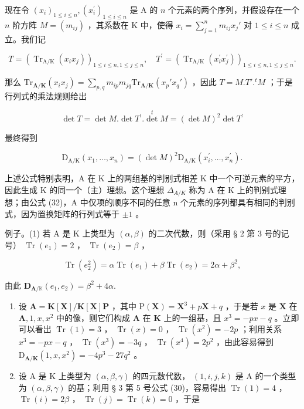 现在令 \((x_{i})_{1\leqslant i\leqslant n},(x_{i}^{\prime})_{1\leqslant i\leqslant n}\) 是 A 的 \(n\) 个元素的两个序列，并假设存在一个 \(n\) 阶方阵 \(M = (m_{ij})\) ，其系数在 K 中，使得 \(x_{i} = \sum_{j=1}^{n} m_{ij} x_{j}'\) 对 \(1 \leqslant i \leqslant n\) 成立。我们记

\[
T = \left(\operatorname{Tr} _ {\mathrm{A} / \mathrm{K}} \left(x _ {i} x _ {j}\right)\right) _ {1 \leqslant i \leqslant n, 1 \leqslant j \leqslant n}, \quad T ^ {\prime} = \left(\operatorname{Tr} _ {\mathrm{A} / \mathrm{K}} \left(x _ {i} ^ {\prime} x _ {j} ^ {\prime}\right)\right) _ {1 \leqslant i \leqslant n, 1 \leqslant j \leqslant n}.
\]

那么 \(\mathrm{Tr}_{\mathbf{A} / \mathbf{K}}(x_i x_j) = \sum_{p,q} m_{ip} m_{jq} \mathrm{Tr}_{\mathbf{A} / \mathbf{K}}(x_p' x_q')\) ，因此 \(T = M. T'.^t M\) ；于是行列式的乘法规则给出

\[
\det T = \det M. \det T ^ {\prime}. \det ^ {t} M = (\det M) ^ {2} \det T ^ {\prime}
\]

最终得到

\[
\mathrm{D} _ {\mathrm{A} / \mathrm{K}} (x _ {1}, \dots , x _ {n}) = (\det M) ^ {2} \mathrm{D} _ {\mathrm{A} / \mathrm{K}} (x _ {i} ^ {\prime}, \dots , x _ {n} ^ {\prime}).\tag{32}
\]

上述公式特别表明，A 在 K 上的两组基的判别式相差 K 中一个可逆元素的平方，因此生成 K 的同一个（主）理想。这个理想 \(\Delta_{A/K}\) 称为 A 在 K 上的判别式理想；由公式 (32)，A 中仅项的顺序不同的任意 n 个元素的序列都具有相同的判别式，因为置换矩阵的行列式等于 \(\pm1\) 。

例子。(1) 若 A 是 K 上类型为 \((\alpha, \beta)\) 的二次代数，则（采用 § 2 第 3 号的记号） \(\operatorname{Tr}(e_1) = 2\) ， \(\operatorname{Tr}(e_2) = \beta\) ，

\[
\operatorname{Tr} (e _ {2} ^ {2}) = \alpha \operatorname{Tr} (e _ {1}) + \beta \operatorname{Tr} (e _ {2}) = 2 \alpha + \beta^ {2},
\]

由此 \(\mathbf{D}_{\mathbf{A} / \mathbb{K}}(e_1,e_2) = \beta^2 +4\alpha .\)

\begin{enumerate}
\def\labelenumi{(\arabic{enumi})}
\setcounter{enumi}{1}
\item
  设 \(\mathbf{A} = \mathbf{K}[\mathbf{X}] / \mathbf{K}[\mathbf{X}]\mathbf{P}\) ，其中 \(\mathrm{P}(\mathbf{X}) = \mathbf{X}^3 + p\mathbf{X} + q\) ，于是若 \(x\) 是 \(\mathbf{X}\) 在 \(\mathbf{A}, 1, x, x^2\) 中的像，则它们构成 \(\mathbf{A}\) 在 \(\mathbf{K}\) 上的一组基，且 \(x^3 = -px - q\) 。立即可以看出 \(\operatorname{Tr}(1) = 3\) ， \(\operatorname{Tr}(x) = 0\) ， \(\operatorname{Tr}(x^2) = -2p\) ；利用关系 \(x^3 = -px - q\) ， \(\operatorname{Tr}(x^3) = -3q\) ， \(\operatorname{Tr}(x^4) = 2p^2\) ，由此容易得到 \(\mathrm{D}_{\mathbf{A} / \mathbf{K}}(1, x, x^2) = -4p^3 - 27q^2\) 。
\item
  设 A 是 K 上类型为 \((\alpha, \beta, \gamma)\) 的四元数代数， \((1, i, j, k)\) 是 A 的一个类型为 \((\alpha, \beta, \gamma)\) 的基；利用 § 3 第 5 号公式 (30)，容易得出 \(\operatorname{Tr}(1) = 4\) ， \(\operatorname{Tr}(i) = 2\beta\) ， \(\operatorname{Tr}(j) = \operatorname{Tr}(k) = 0\) ，于是
\end{enumerate}

